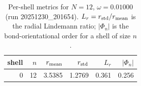 \begin{table}[t]
\centering
\small
\setlength{\tabcolsep}{4pt}
\renewcommand{\arraystretch}{1.15}
\begin{tabular}{r r r r r r}
\toprule
shell & $n$ & $r_{\rm mean}$ & $r_{\rm std}$ & $L_r$ & $|\Phi_n|$ \\
\midrule
0 & 12 & 3.5385 & 1.2769 & 0.361 & 0.256 \\
\bottomrule
\end{tabular}
\caption{Per-shell metrics for $N=12$, $\omega=0.01000$ (run 20251230_201654). $L_r=r_{\rm std}/r_{\rm mean}$ is the radial Lindemann ratio; $|\Phi_n|$ is the bond-orientational order for a shell of size $n$.}
\end{table}